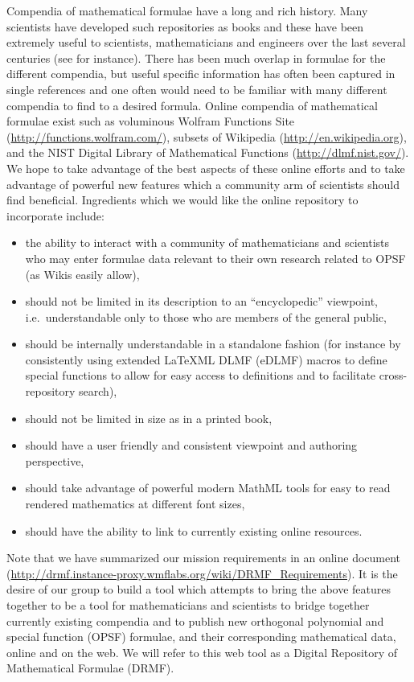 \documentclass{easychair}
\begin{document}
Compendia of mathematical formulae have a long and rich history. Many
scientists have developed such repositories as books and these have been
extremely useful to scientists, mathematicians and engineers over the last 
several centuries (see 
\cite{
Brych,
ErdelyiHTF,
ErdelyiTIT,
Grad,
MOS,
PrudBrychMar}
for instance).  
There has been much overlap in formulae for the different 
compendia, but 
useful specific information has often been captured in 
single references and one often would need to be familiar with many different
compendia to find to a desired formula.  Online compendia of mathematical 
formulae exist such as voluminous Wolfram Functions Site 
(\url{http://functions.wolfram.com/}), subsets of Wikipedia 
(\url{http://en.wikipedia.org}), and the NIST Digital Library of Mathematical
Functions (\url{http://dlmf.nist.gov/}).  We hope to take advantage of the
best aspects of these online efforts and to take advantage of powerful new
features which a community arm of scientists should find beneficial.
Ingredients which we would like the online repository to incorporate include: 
\begin{itemize}
\item the ability to interact with a community of mathematicians and scientists 
who may enter formulae data relevant to their own research related to OPSF 
(as Wikis easily allow),
\item should not be limited in its description 
to an ``encyclopedic'' viewpoint, i.e.~understandable only to those who are 
members of the general public, 
\item should be internally understandable in a standalone fashion
(for instance by consistently using extended \LaTeX ML DLMF (eDLMF) macros to define 
special functions to allow for easy access to definitions and to facilitate 
cross-repository search),
\item should not be limited in size as in a printed book,
\item should have a user friendly and consistent viewpoint and authoring perspective,
\item should take advantage of powerful modern MathML tools for easy to read rendered 
mathematics at different font sizes, 
\item should have the ability to link to currently existing online resources.
\end{itemize}
Note that we have summarized our mission requirements in an online document
(\url{http://drmf.instance-proxy.wmflabs.org/wiki/DRMF_Requirements}).
It is the desire of our group to build a tool which 
attempts to bring the above features together to be a tool for mathematicians 
and scientists to bridge together currently existing compendia and to publish new orthogonal 
polynomial and special function (OPSF) formulae, and their corresponding 
mathematical data, online and on the web.  We will refer to this web tool as a
Digital Repository of Mathematical Formulae (DRMF).
\end{document}
